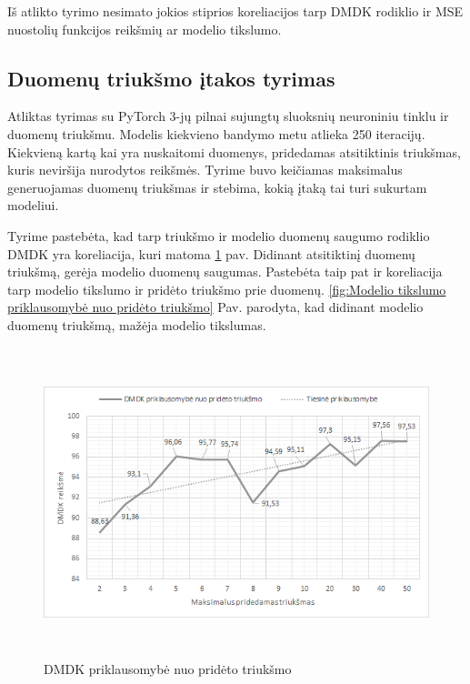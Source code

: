 \documentclass{VUMIFInfBakalaurinis}
\begin{document}
\par Iš atlikto tyrimo nesimato jokios stiprios koreliacijos tarp DMDK rodiklio ir MSE nuostolių funkcijos reikšmių ar modelio tikslumo.

\subsection{Duomenų triukšmo įtakos tyrimas}

\par Atliktas tyrimas su PyTorch 3-jų pilnai sujungtų sluoksnių neuroniniu tinklu ir duomenų triukšmu. Modelis kiekvieno bandymo metu atlieka 250 iteracijų. Kiekvieną kartą kai yra nuskaitomi duomenys, pridedamas atsitiktinis triukšmas, kuris neviršija nurodytos reikšmės. Tyrime buvo keičiamas maksimalus generuojamas duomenų triukšmas ir stebima, kokią įtaką tai turi sukurtam modeliui.
\par Tyrime pastebėta, kad tarp triukšmo ir modelio duomenų saugumo rodiklio DMDK yra koreliacija, kuri matoma \ref{fig:DMDK priklausomybė nuo pridėto triukšmo} pav. Didinant atsitiktinį duomenų triukšmą, gerėja modelio duomenų saugumas. Pastebėta taip pat ir koreliacija tarp modelio tikslumo ir pridėto triukšmo prie duomenų. \ref{fig:Modelio tikslumo priklausomybė nuo pridėto triukšmo} Pav. parodyta, kad didinant modelio duomenų triukšmą, mažėja modelio tikslumas.

\begin{figure}[h]
  \centering
  \includegraphics[width=13cm,height=9cm,keepaspectratio]{img/tr_tyr_dmdk.png}
  \caption{DMDK priklausomybė nuo pridėto triukšmo}
  \label{fig:DMDK priklausomybė nuo pridėto triukšmo}
\end{figure}
\end{document}
